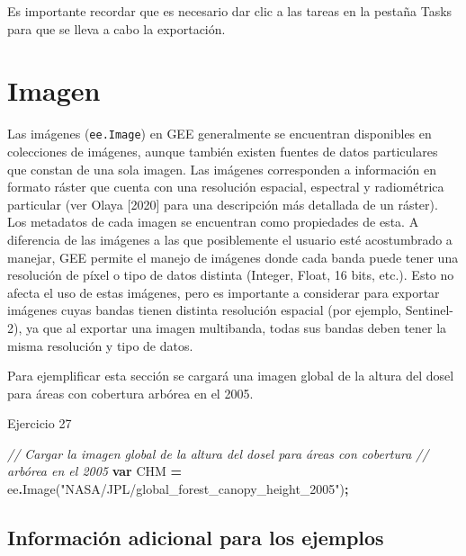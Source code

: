 \documentclass[
  12pt,
  letterpaper,
  twoside]{book}
\newenvironment{Shaded}{\begin{snugshade}}{\end{snugshade}}
\newcommand{\CommentTok}[1]{\textcolor[rgb]{0.56,0.35,0.01}{\textit{#1}}}
\newcommand{\FunctionTok}[1]{\textcolor[rgb]{0.00,0.00,0.00}{#1}}
\newcommand{\KeywordTok}[1]{\textcolor[rgb]{0.13,0.29,0.53}{\textbf{#1}}}
\newcommand{\NormalTok}[1]{#1}
\newcommand{\OperatorTok}[1]{\textcolor[rgb]{0.81,0.36,0.00}{\textbf{#1}}}
\newcommand{\StringTok}[1]{\textcolor[rgb]{0.31,0.60,0.02}{#1}}
\begin{document}
Es importante recordar que es necesario dar clic a las tareas en la pestaña Tasks para que se lleva a cabo la exportación.

\newpage

\hypertarget{imagen}{%
\chapter{Imagen}\label{imagen}}

Las imágenes (\texttt{ee.Image}) en GEE generalmente se encuentran disponibles en colecciones de imágenes, aunque también existen fuentes de datos particulares que constan de una sola imagen. Las imágenes corresponden a información en formato ráster que cuenta con una resolución espacial, espectral y radiométrica particular (ver Olaya {[}2020{]} para una descripción más detallada de un ráster). Los metadatos de cada imagen se encuentran como propiedades de esta. A diferencia de las imágenes a las que posiblemente el usuario esté acostumbrado a manejar, GEE permite el manejo de imágenes donde cada banda puede tener una resolución de píxel o tipo de datos distinta (Integer, Float, 16 bits, etc.). Esto no afecta el uso de estas imágenes, pero es importante a considerar para exportar imágenes cuyas bandas tienen distinta resolución espacial (por ejemplo, Sentinel-2), ya que al exportar una imagen multibanda, todas sus bandas deben tener la misma resolución y tipo de datos.

Para ejemplificar esta sección se cargará una imagen global de la altura del dosel para áreas con cobertura arbórea en el 2005.

Ejercicio 27

\begin{Shaded}
\begin{Highlighting}[]
\CommentTok{// Cargar la imagen global de la altura del dosel para áreas con cobertura }
\CommentTok{// arbórea en el 2005}
\KeywordTok{var}\NormalTok{ CHM }\OperatorTok{=}\NormalTok{ ee}\OperatorTok{.}\FunctionTok{Image}\NormalTok{(}\StringTok{"NASA/JPL/global\_forest\_canopy\_height\_2005"}\NormalTok{)}\OperatorTok{;}
\end{Highlighting}
\end{Shaded}

\hypertarget{informaciuxf3n-adicional-para-los-ejemplos}{%
\section{Información adicional para los ejemplos}\label{informaciuxf3n-adicional-para-los-ejemplos}}
\end{document}
